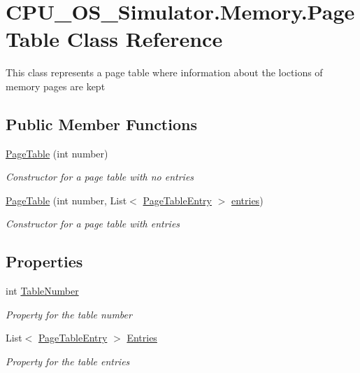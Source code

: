\hypertarget{class_c_p_u___o_s___simulator_1_1_memory_1_1_page_table}{}\section{C\+P\+U\+\_\+\+O\+S\+\_\+\+Simulator.\+Memory.\+Page\+Table Class Reference}
\label{class_c_p_u___o_s___simulator_1_1_memory_1_1_page_table}


This class represents a page table where information about the loctions of memory pages are kept  


\subsection*{Public Member Functions}
\begin{DoxyCompactItemize}
\item 
\hyperlink{class_c_p_u___o_s___simulator_1_1_memory_1_1_page_table_a82e8026d70d5bd7cd7376d8af809952a}{Page\+Table} (int number)
\begin{DoxyCompactList}\small\item\em Constructor for a page table with no entries \end{DoxyCompactList}\item 
\hyperlink{class_c_p_u___o_s___simulator_1_1_memory_1_1_page_table_a29c9c3d340af4ab70e642399027301e5}{Page\+Table} (int number, List$<$ \hyperlink{class_c_p_u___o_s___simulator_1_1_memory_1_1_page_table_entry}{Page\+Table\+Entry} $>$ \hyperlink{class_c_p_u___o_s___simulator_1_1_memory_1_1_page_table_afaec11faaccf2f772fa8d5c52cfcf9ad}{entries})
\begin{DoxyCompactList}\small\item\em Constructor for a page table with entries \end{DoxyCompactList}\end{DoxyCompactItemize}
\subsection*{Properties}
\begin{DoxyCompactItemize}
\item 
int \hyperlink{class_c_p_u___o_s___simulator_1_1_memory_1_1_page_table_a7a30b834bfe4da78dcaa6276b4572c93}{Table\+Number}
\begin{DoxyCompactList}\small\item\em Property for the table number \end{DoxyCompactList}\item 
List$<$ \hyperlink{class_c_p_u___o_s___simulator_1_1_memory_1_1_page_table_entry}{Page\+Table\+Entry} $>$ \hyperlink{class_c_p_u___o_s___simulator_1_1_memory_1_1_page_table_a39686465a9c618e73a0a2d8f316ffa2c}{Entries}
\begin{DoxyCompactList}\small\item\em Property for the table entries \end{DoxyCompactList}\end{DoxyCompactItemize}
